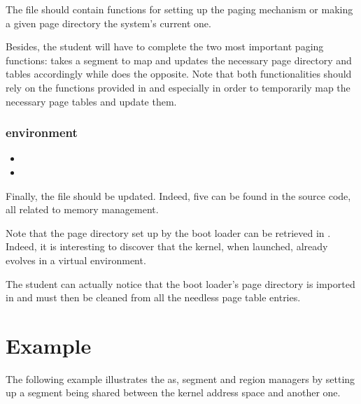 The  file should contain functions for setting up the
paging mechanism or making a given page directory the system's current one.

Besides, the student will have to complete the two most important paging
functions:  takes a segment to map and
updates the necessary page directory and tables accordingly while
 does the opposite. Note that both
functionalities should rely on the functions provided in  and
 especially in order to temporarily map the necessary page
tables and update them.

\subsubsection*{environment}

\begin{itemize}
  \item
  \item
\end{itemize}

Finally, the  file should be updated. Indeed,
five  can be found in the source code, all related to memory
management.

Note that the page directory set up by the boot loader can be retrieved
in . Indeed, it is interesting to discover that the
kernel, when launched, already evolves in a virtual environment.

The student can actually notice that the boot loader's page directory is
imported in  and must then be
cleaned from all the needless page table entries.

%
%

\section{Example}

The following example illustrates the as, segment and region managers by
setting up a segment being shared between the kernel address space and
another one.

